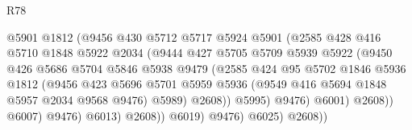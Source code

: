 \begin{lexlean}{R78}
\begin{coremodule}
                                    @5901
                                    @1812
                                    (@9456
                                      @430
                                      @5712
                                      @5717
                                      @5924
                                      @5901
                                      (@2585
                                        @428
                                        @416
                                        @5710
                                        @1848
                                        @5922
                                        @2034
                                        (@9444
                                          @427
                                          @5705
                                          @5709
                                          @5939
                                          @5922
                                          (@9450
                                            @426
                                            @5686
                                            @5704
                                            @5846
                                            @5938
                                            @9479
                                            (@2585
                                              @424
                                              @95
                                              @5702
                                              @1846
                                              @5936
                                              @1812
                                              (@9456
                                                @423
                                                @5696
                                                @5701
                                                @5959
                                                @5936
                                                (@9549 @416 @5694 @1848 @5957 @2034 @9568 @9476)
                                                @5989)
                                              @2608))
                                          @5995)
                                        @9476)
                                      @6001)
                                    @2608))
                                @6007)
                              @9476)
                            @6013)
                          @2608))
                      @6019)
                    @9476)
                  @6025)
                @2608))

\end{coremodule}
\end{lexlean}
